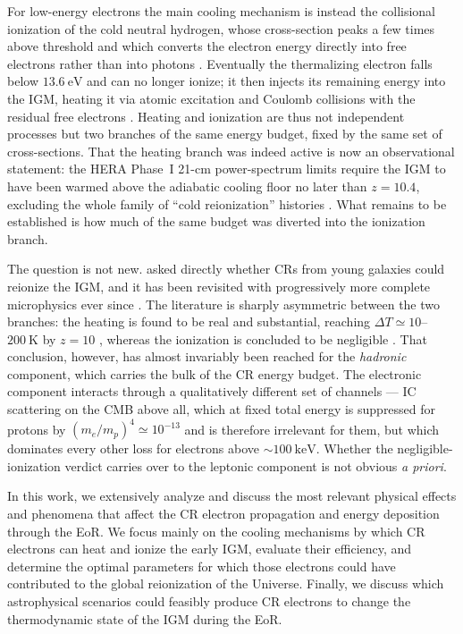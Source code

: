 For low-energy electrons the main cooling mechanism is instead the collisional
ionization of the cold neutral hydrogen, whose cross-section peaks a few times
above threshold and which converts the electron energy directly into free
electrons rather than into photons \citep{KimRudd1994,Kim2000}. Eventually the
thermalizing electron falls below $13.6\ \mathrm{eV}$ and can no longer ionize;
it then injects its remaining energy into the IGM, heating it via atomic
excitation and Coulomb collisions with the residual free electrons
\citep{Shull1985,Furlanetto2010}. Heating and ionization are thus not
independent processes but two branches of the same energy budget, fixed by the
same set of cross-sections. That the heating branch was indeed active is now
an observational statement: the HERA Phase~I 21-cm power-spectrum limits
require the IGM to have been warmed above the adiabatic cooling floor no later
than $z = 10.4$, excluding the whole family of ``cold reionization'' histories
\citep{HERA2023,Mertens2025}. What remains to be established is how much of the
same budget was diverted into the ionization branch.

The question is not new. \citet{Nath1993} asked directly whether CRs from young
galaxies could reionize the IGM, and it has been revisited with progressively
more complete microphysics ever since
\citep{Samui2005,Sazonov2015,Leite2017,Jana2018,Bera2023,GesseyJones2023}. The
literature is sharply asymmetric between the two branches: the heating is found
to be real and substantial, reaching $\Delta T \simeq 10$--$200\ \mathrm{K}$ by
$z = 10$ \citep{Sazonov2015,Leite2017}, whereas the ionization is concluded to
be negligible \citep{Leite2017}. That conclusion, however, has almost
invariably been reached for the \emph{hadronic} component, which carries the
bulk of the CR energy budget. The electronic component interacts through a
qualitatively different set of channels --- IC scattering on the CMB above all,
which at fixed total energy is suppressed for protons by
$(m_e/m_p)^{4} \simeq 10^{-13}$ and is therefore irrelevant for them, but which
dominates every other loss for electrons above $\sim\!100\ \mathrm{keV}$.
Whether the negligible-ionization verdict carries over to the leptonic
component is not obvious \emph{a priori}.

In this work, we extensively analyze and discuss the most relevant physical
effects and phenomena that affect the CR electron propagation and energy
deposition through the EoR. We focus mainly on the cooling mechanisms by which
CR electrons can heat and ionize the early IGM, evaluate their efficiency, and
determine the optimal parameters for which those electrons could have
contributed to the global reionization of the Universe. Finally, we discuss
which astrophysical scenarios could feasibly produce CR electrons to change the
thermodynamic state of the IGM during the EoR.
